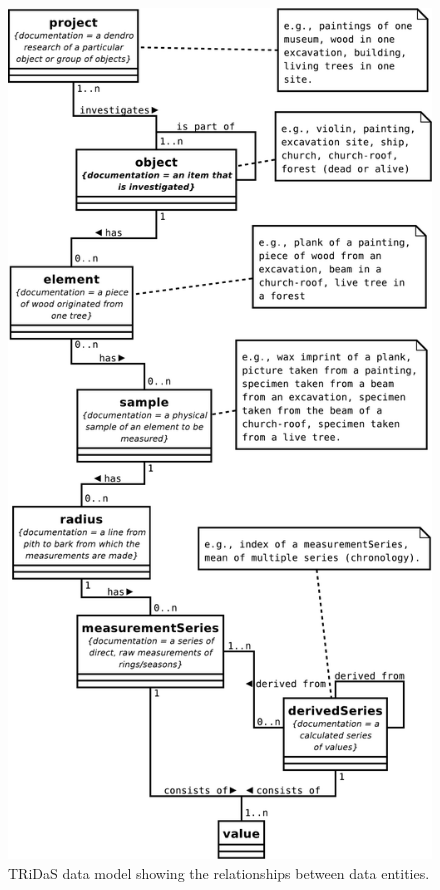 \begin{figure}
\centering
\includegraphics[height=0.9\textheight]{Images/datamodel.pdf}
\caption{TRiDaS data model showing the relationships between data entities.} 
\label{figdatamodel}
\end{figure}

